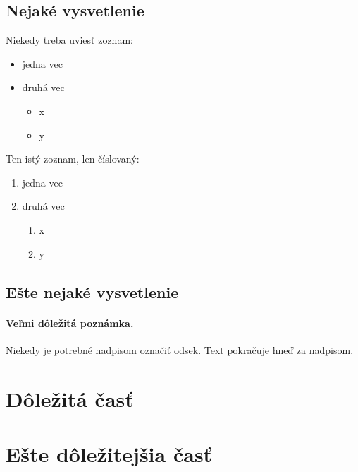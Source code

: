 \documentclass[10pt,twoside,slovak,coursepaper]{article}
\begin{document}
\subsection{Nejaké vysvetlenie} \label{ina:nejake}

Niekedy treba uviesť zoznam:

\begin{itemize}
\item jedna vec
\item druhá vec
	\begin{itemize}
	\item x
	\item y
	\end{itemize}
\end{itemize}

Ten istý zoznam, len číslovaný:

\begin{enumerate}
\item jedna vec
\item druhá vec
	\begin{enumerate}
	\item x
	\item y
	\end{enumerate}
\end{enumerate}


\subsection{Ešte nejaké vysvetlenie} \label{ina:este}

\paragraph{Veľmi dôležitá poznámka.}\href{}{}
Niekedy je potrebné nadpisom označiť odsek. Text pokračuje hneď za 
nadpisom.



\section{Dôležitá časť} \label{dolezita}




\section{Ešte dôležitejšia časť} \label{dolezitejsia}




\section{Záver} \label{zaver} %
\end{document}
